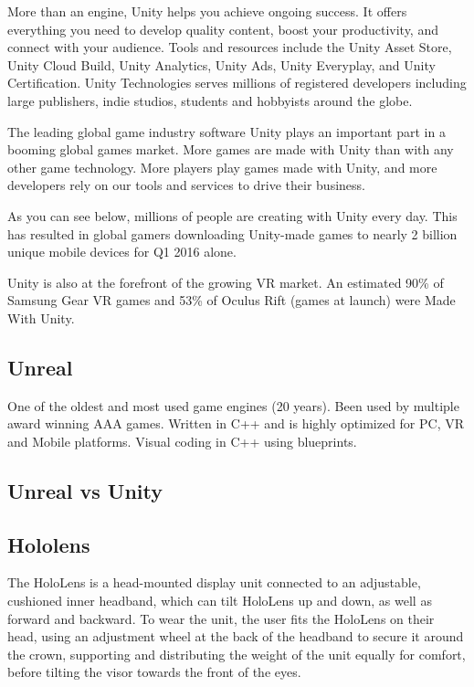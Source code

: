     More than an engine, Unity helps you achieve ongoing success. It offers everything you need to develop quality content, boost your productivity, and connect with your audience. Tools and resources include the Unity Asset Store, Unity Cloud Build, Unity Analytics, Unity Ads, Unity Everyplay, and Unity Certification. Unity Technologies serves millions of registered developers including large publishers, indie studios, students and hobbyists around the globe.
    
    The leading global game industry software
    Unity plays an important part in a booming global games market. More games are made with Unity than with any other game technology. More players play games made with Unity, and more developers rely on our tools and services to drive their business.
    
    As you can see below, millions of people are creating with Unity every day. This has resulted in global gamers downloading Unity-made games to nearly 2 billion unique mobile devices for Q1 2016 alone.
    
    Unity is also at the forefront of the growing VR market. An estimated 90\% of Samsung Gear VR games and 53\% of Oculus Rift (games at launch) were Made With Unity. %
    
    \subsection{Unreal}
    One of the oldest and most used game engines (20 years). Been used by multiple award winning AAA games. Written in C++ and is highly optimized for PC, VR and Mobile platforms.
    Visual coding in C++ using blueprints.

    \subsection{Unreal vs Unity}

    \subsection{Hololens}
    The HoloLens is a head-mounted display unit connected to an adjustable, cushioned inner headband, which can tilt HoloLens up and down, as well as forward and backward. To wear the unit, the user fits the HoloLens on their head, using an adjustment wheel at the back of the headband to secure it around the crown, supporting and distributing the weight of the unit equally for comfort, before tilting the visor towards the front of the eyes.

